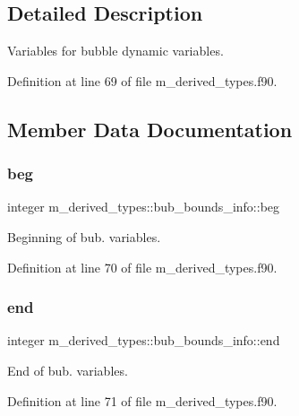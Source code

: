 \subsection{Detailed Description}
Variables for bubble dynamic variables. 

Definition at line 69 of file m\+\_\+derived\+\_\+types.\+f90.



\subsection{Member Data Documentation}
\mbox{\label{structm__derived__types_1_1bub__bounds__info_af1cd7c7f30de05a0f9ee49f5d23ef354}} 
\subsubsection{\texorpdfstring{beg}{beg}}
{\footnotesize\ttfamily integer m\+\_\+derived\+\_\+types\+::bub\+\_\+bounds\+\_\+info\+::beg}



Beginning of bub. variables. 



Definition at line 70 of file m\+\_\+derived\+\_\+types.\+f90.

\mbox{\label{structm__derived__types_1_1bub__bounds__info_a01730fa85d33e3174561ad5182d2e052}} 
\subsubsection{\texorpdfstring{end}{end}}
{\footnotesize\ttfamily integer m\+\_\+derived\+\_\+types\+::bub\+\_\+bounds\+\_\+info\+::end}



End of bub. variables. 



Definition at line 71 of file m\+\_\+derived\+\_\+types.\+f90.

